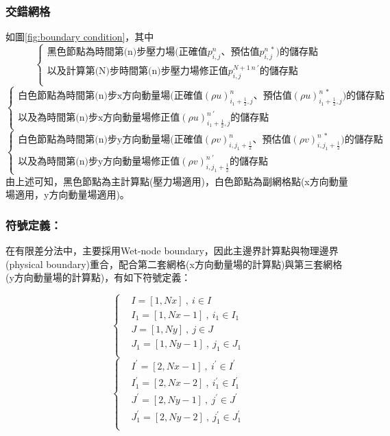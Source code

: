 \documentclass[12pt]{article}
\begin{document}
\subsubsection{交錯網格}
如圖\ref{fig:boundary condition}，其中
\[
\left\{
\begin{array}{l}
    \text{黑色節點為時間第(n)步壓力場(正確值$p_{i,j}^{n}$、預估值$p_{i,j}^{n\ *}$)的儲存點}\\[1.5ex]
    \text{以及計算第(N)步時間第(n)步壓力場修正值$p_{i,j}^{N+1\ n\ \prime}$的儲存點}\\[1.5ex]
\end{array}
\right.
\]
\[
\left\{
\begin{array}{l}
    \text{白色節點為時間第(n)步x方向動量場(正確值$(\rho u)_{i_{1}+\frac{1}{2},j}^{n}$、預估值$(\rho u)_{i_{1}+\frac{1}{2},j}^{n\ *}$)的儲存點}\\[1.5ex]
    \text{以及為時間第(n)步x方向動量場修正值$(\rho u)_{i_{1}+\frac{1}{2},j}^{n\ \prime}$的儲存點}
\end{array}
\right.
\]
\[
\left\{
\begin{array}{l}
    \text{白色節點為時間第(n)步y方向動量場(正確值$(\rho v)_{i,j_{1}+\frac{1}{2}}^{n}$、預估值$(\rho v)_{i,j_{1}+\frac{1}{2}}^{n\ *}$)的儲存點}\\[1.5ex]
    \text{以及為時間第(n)步y方向動量場修正值$(\rho v)_{i,j_{1}+\frac{1}{2}}^{n\ \prime}$的儲存點}
\end{array}
\right.
\]
\noindent 由上述可知，黑色節點為主計算點(壓力場適用)，白色節點為副網格點(x方向動量場適用，y方向動量場適用)。

\subsubsection{符號定義：}
在有限差分法中，主要採用Wet-node boundary，因此主邊界計算點與物理邊界(physical boundary)重合，配合第二套網格(x方向動量場的計算點)與第三套網格(y方向動量場的計算點)，有如下符號定義：

\begin{equation*}\left\{\begin{split}
    &I = [1,Nx]\ ,\ i \in I \\[1.5ex]
    &I_{1} = [1,Nx-1]\ ,\ i_{1} \in I_{1} \\[1.5ex]
    &J = [1,Ny]\ ,\ j \in J \\[1.5ex]
    &J_{1} = [1,Ny-1]\ ,\ j_{1} \in J_{1} \\[1.5ex]
    \end{split}\right.\end{equation*}
    \begin{equation*}\left\{\begin{split}
    &I^{\prime} = [2,Nx-1]\ ,\ i^{\prime} \in I^{\prime} \\[1.5ex]
    &I_{1}^{\prime} = [2,Nx-2]\ ,\ i_{1}^{\prime} \in I_{1}^{\prime} \\[1.5ex]
    &J^{\prime} = [2,Ny-1]\ ,\ j^{\prime} \in J^{\prime} \\[1.5ex]
    &J_{1}^{\prime} = [2,Ny-2]\ ,\ j_{1}^{\prime} \in J_{1}^{\prime} \\[1.5ex]
\end{split}\right.\end{equation*}
\end{document}
